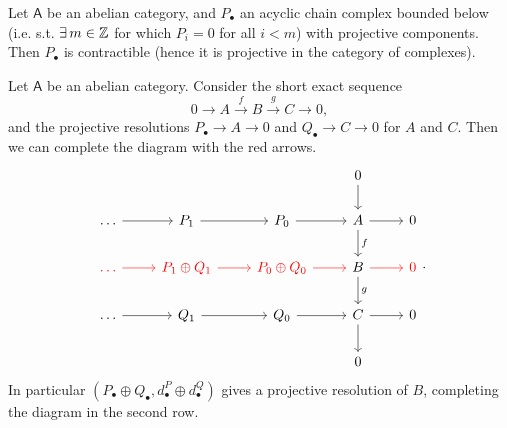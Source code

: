 \begin{lem}
	Let $\mathsf{A}$ be an abelian category, and $P_{\bullet}$ an acyclic
	chain complex bounded below (i.e. s.t. $\exists\, m \in \mathbb{Z}$ for which
	$P_i = 0$ for all $i < m$) with projective components.
	Then $P_{\bullet}$ is contractible
	(hence it is projective in the category of complexes).
\end{lem} 

\begin{lem}[Horseshoe]
	Let $\mathsf{A}$ be an abelian category.
	Consider the short exact sequence
	\begin{equation}
	0 \to A \xrightarrow{f} B \xrightarrow{g} C \to 0
	,\end{equation} 
	and the projective resolutions $P_{\bullet} \to A \to 0$ and $Q_{\bullet} \to C \to 0$
	for $A$ and $C$.
	Then we can complete the diagram with the red arrows.
	\begin{equation}
	\begin{tikzcd}
		& & & 0 \arrow[d, "", rightarrow] & \\
		\ldots \arrow[r, "", rightarrow] &
		P_1 \arrow[r, "", rightarrow] &
		P_0 \arrow[r, "", rightarrow] &
		A \arrow[r, "", rightarrow] \arrow[d, "f", rightarrow] &
		0\\
		{\color{red}\ldots} \arrow[r, red, "", rightarrow] &
		{\color{red} P_1 \oplus Q_1} \arrow[r, red, "", rightarrow] &
		{\color{red} P_0 \oplus Q_0} \arrow[r, red, "", rightarrow] &
		B \arrow[r, red, "", rightarrow] \arrow[d, "g", rightarrow] &
		{\color{red}0}\\
		\ldots \arrow[r, "", rightarrow] &
		Q_1 \arrow[r, "", rightarrow] &
		Q_0 \arrow[r, "", rightarrow] &
		C \arrow[r, "", rightarrow] \arrow[d, "", rightarrow] &
		0\\
		& & & 0 &
	\end{tikzcd}
	.\end{equation} 
	In particular $\left( P_{\bullet} \oplus Q_{\bullet}, d^P_{\bullet} \oplus d^Q_{\bullet} \right)$
	gives a projective resolution of $B$, completing the diagram in the second row.
\end{lem} 

